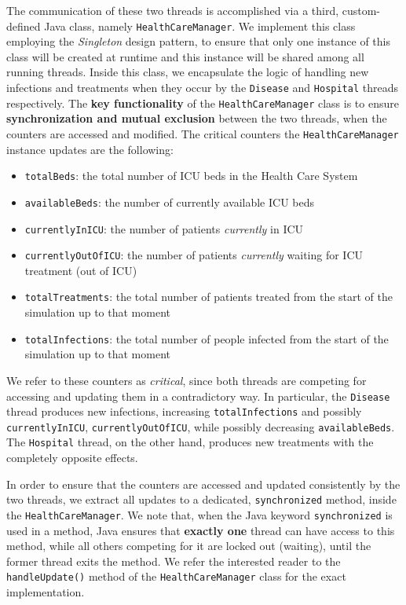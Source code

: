\documentclass[acmlarge]{acmart}
\begin{document}
The communication of these two threads is accomplished via a third, custom-defined Java class, namely \texttt{HealthCareManager}. We implement this class employing the \textit{Singleton} design pattern, to ensure that only one instance of this class will be created at runtime and this instance will be shared among all running threads. Inside this class, we encapsulate the logic of handling new infections and treatments when they occur by the \texttt{Disease} and \texttt{Hospital} threads respectively. The \textbf{key functionality} of the \texttt{HealthCareManager} class is to ensure \textbf{synchronization and mutual exclusion} between the two threads, when the counters are accessed and modified. The critical counters the \texttt{HealthCareManager} instance updates are the following:
\begin{itemize}
  \item \texttt{totalBeds}: the total number of ICU beds in the Health Care System
  \item \texttt{availableBeds}: the number of currently available ICU beds
  \item \texttt{currentlyInICU}: the number of patients \emph{currently} in ICU
  \item \texttt{currentlyOutOfICU}: the number of patients \emph{currently} waiting for ICU treatment (out of ICU)
  \item \texttt{totalTreatments}: the total number of patients treated from the start of the simulation up to that moment
  \item \texttt{totalInfections}: the total number of people infected from the start of the simulation up to that moment
\end{itemize}

We refer to these counters as \emph{critical}, since both threads are competing for accessing and updating them in a contradictory way. In particular, the \texttt{Disease} thread produces new infections, increasing \texttt{totalInfections} and possibly \texttt{currentlyInICU}, \texttt{currentlyOutOfICU}, while possibly decreasing \texttt{availableBeds}. The \texttt{Hospital} thread, on the other hand, produces new treatments with the completely opposite effects.

In order to ensure that the counters are accessed and updated consistently by the two threads, we extract all updates to a dedicated, \texttt{synchronized} method, inside the \texttt{HealthCareManager}. We note that, when the Java keyword \texttt{synchronized} is used in a method, Java ensures that \textbf{exactly one} thread can have access to this method, while all others competing for it are locked out (waiting), until the former thread exits the method. We refer the interested reader to the \texttt{handleUpdate()} method of the \texttt{HealthCareManager} class for the exact implementation.
\end{document}
